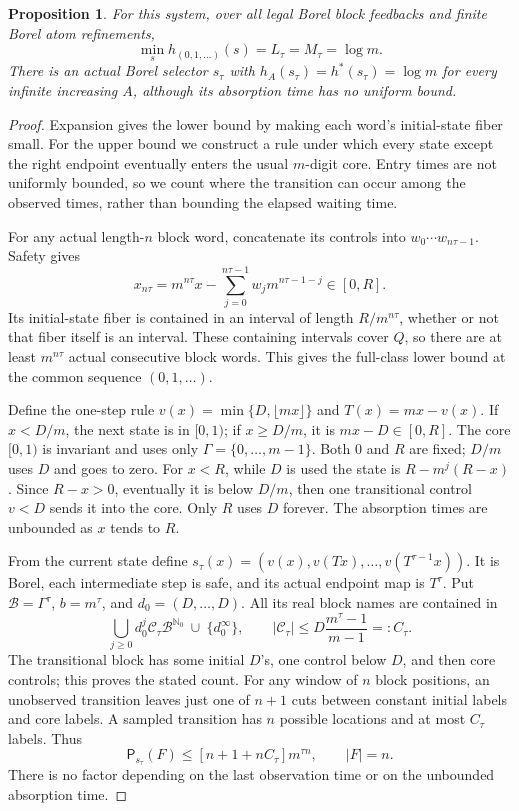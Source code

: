 \documentclass[11pt,reqno]{amsart}
\numberwithin{equation}{section}
\newtheorem{proposition}[theorem]{Proposition}
\theoremstyle{definition}
\theoremstyle{definition}
\newcommand{\Nzero}{\mathbb N_0}
\newcommand{\Patt}{\mathsf P}
\begin{document}
\begin{proposition}\label{prop:integer}
For this system, over all legal Borel block feedbacks and finite
Borel atom refinements,
\[
 \min_s h_{(0,1,\ldots)}(s)=L_\tau=M_\tau=\log m.
\]
There is an actual Borel selector $s_\tau$ with
$h_A(s_\tau)=h^*(s_\tau)=\log m$ for every infinite increasing
$A$, although its absorption time has no uniform bound.
\end{proposition}
\begin{proof}
Expansion gives the lower bound by making each word's initial-state
fiber small. For the upper bound we construct a rule under which
every state except the right endpoint eventually enters the usual
$m$-digit core. Entry times are not uniformly bounded,
so we count where the transition can occur among the observed times,
rather than bounding the elapsed waiting time.

For any actual length-$n$ block word, concatenate its controls into
$w_0\cdots w_{n\tau-1}$. Safety gives
\[
 x_{n\tau}=m^{n\tau}x-\sum_{j=0}^{n\tau-1}
                   w_jm^{n\tau-1-j}\in[0,R].
\]
Its initial-state fiber is contained in an interval of length
$R/m^{n\tau}$, whether or not that fiber itself is an interval.
These containing intervals cover $Q$, so there are at least
$m^{n\tau}$ actual consecutive block words. This gives the
full-class lower bound at the common sequence $(0,1,\ldots)$.

Define the one-step rule $v(x)=\min\{D,\lfloor mx\rfloor\}$
and $T(x)=mx-v(x)$. If $x<D/m$, the next state is in $[0,1)$;
if $x\ge D/m$, it is $mx-D\in[0,R]$.
The core $[0,1)$ is invariant and uses only
$\Gamma=\{0,\ldots,m-1\}$. Both $0$ and $R$ are fixed;
$D/m$ uses $D$ and goes to zero.
For $x<R$, while $D$ is used the state is
$R-m^j(R-x)$. Since $R-x>0$, eventually it is below $D/m$,
then one transitional control $v<D$ sends it into the core.
Only $R$ uses $D$ forever. The absorption times are unbounded
as $x$ tends to $R$.

From the current state define
$s_\tau(x)=(v(x),v(Tx),\ldots,v(T^{\tau-1}x))$.
It is Borel, each intermediate step is safe, and its actual endpoint
map is $T^\tau$. Put $\mathcal B=\Gamma^\tau$,
$b=m^\tau$, and $d_0=(D,\ldots,D)$.
All its real block names are contained in
\[
 \bigcup_{j\ge0}d_0^j\mathcal C_\tau\mathcal B^{\Nzero}
 \ \cup\ \{d_0^\infty\},\qquad
 |\mathcal C_\tau|\le D\frac{m^\tau-1}{m-1}=:C_\tau.
\]
The transitional block has some initial $D$'s, one control below
$D$, and then core controls; this proves the stated count.
For any window of $n$ block positions, an unobserved transition
leaves just one of $n+1$ cuts between constant initial labels and
core labels. A sampled transition has $n$ possible locations and
at most $C_\tau$ labels. Thus
\[
 \Patt_{s_\tau}(F)\le[n+1+nC_\tau]m^{\tau n},\qquad |F|=n.
\]
There is no factor depending on the last observation time or on
the unbounded absorption time.


\end{proof}
\end{document}
